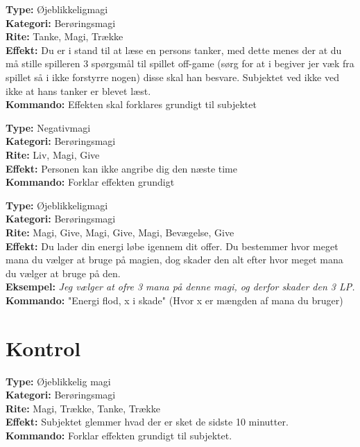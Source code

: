 \begin{passiv*}
\textbf{Type:} Øjeblikkeligmagi\\
\textbf{Kategori:} Berøringsmagi\\
\textbf{Rite:} Tanke, Magi, Trække\\
\textbf{Effekt:} Du er i stand til at læse en persons tanker, med dette menes der at du må stille spilleren 3 spørgsmål til spillet off-game (sørg for at i begiver jer væk fra spillet så i ikke forstyrre nogen) disse skal han besvare. Subjektet ved ikke ved ikke at hans tanker er blevet læst.\\
\textbf{Kommando:} Effekten skal forklares grundigt til subjektet
\end{passiv*}

\begin{passiv*}[Fred]
\textbf{Type:} Negativmagi\\
\textbf{Kategori:} Berøringsmagi\\
\textbf{Rite:} Liv, Magi, Give\\
\textbf{Effekt:} Personen kan ikke angribe dig den næste time\\
\textbf{Kommando:} Forklar effekten grundigt
\end{passiv*}

\begin{passiv*}
\textbf{Type:} Øjeblikkeligmagi\\
\textbf{Kategori:} Berøringsmagi\\
\textbf{Rite:} Magi, Give, Magi, Give, Magi, Bevægelse, Give\\
\textbf{Effekt:} Du lader din energi løbe igennem dit offer. Du bestemmer hvor meget mana du vælger at bruge på magien, dog skader den alt efter hvor meget mana du vælger at bruge på den.\\
\textbf{Eksempel:} \textit{ Jeg vælger at ofre 3 mana på denne magi, og derfor skader den 3 LP.}\\
\textbf{Kommando:} "Energi flod, x i skade" (Hvor x er mængden af mana du bruger)\\
\end{passiv*}

\section{Kontrol}

\begin{kontrol*}[Glemsel]
\textbf{Type:} Øjeblikkelig magi\\
\textbf{Kategori:} Berøringsmagi\\
\textbf{Rite:} Magi, Trække, Tanke, Trække\\
\textbf{Effekt:} Subjektet glemmer hvad der er sket de sidste 10 minutter.\\
\textbf{Kommando:} Forklar effekten grundigt til subjektet.
\end{kontrol*}

